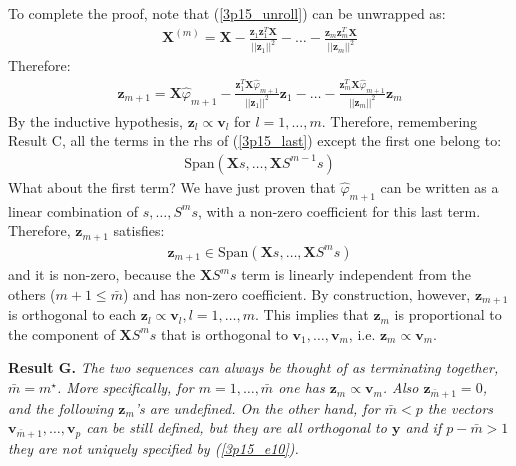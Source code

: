 \begin{itemize}
To complete the proof, note that (\ref{3p15_unroll}) can be unwrapped as:
\begin{eqnarray*}
\mathbf{X}^{(m)} = \mathbf{X} - \frac{ \mathbf{z}_1 \mathbf{z}_1^T \mathbf{X}}{||\mathbf{z}_1||^2} - \ldots  - \frac{ \mathbf{z}_m \mathbf{z}_m^T \mathbf{X}}{||\mathbf{z}_m||^2}
\end{eqnarray*}
Therefore:
\begin{eqnarray} \label{3p15_last}
\mathbf{z}_{m + 1} = \mathbf{X} \hat{\varphi}_{m + 1} - \frac{\mathbf{z}_1^T \mathbf{X} \hat{\varphi}_{m + 1}}{ || \mathbf{z}_1||^2} \mathbf{z}_1 - \ldots - 
\frac{\mathbf{z}_m^T \mathbf{X} \hat{\varphi}_{m + 1}}{ || \mathbf{z}_m||^2} \mathbf{z}_m
\end{eqnarray}
By the inductive hypothesis, $\mathbf{z}_l \propto \mathbf{v}_l$ for $l = 1, \ldots, m$. 
Therefore, remembering Result C, all the terms in the rhs of (\ref{3p15_last}) except the first one belong to:
\begin{eqnarray*}
\textrm{Span} \left( \mathbf{X}s, \ldots, \mathbf{X}S^{m - 1}s \right)
\end{eqnarray*}
What about the first term? We have just proven that $\hat{\varphi}_{m + 1}$ can be written as
a linear combination of $s, \ldots, S^{m}s$, with a non-zero coefficient for this last term.
Therefore, $\mathbf{z}_{m +1}$ satisfies:
\begin{eqnarray*}
\mathbf{z}_{m + 1} \in \textrm{Span} \left( \mathbf{X}s, \ldots, \mathbf{X}S^{m} s \right)
\end{eqnarray*}
and it is non-zero, because the $\mathbf{X}S^{m} s$ term is linearly independent from the 
others ($m + 1 \leq \bar{m}$) and has non-zero coefficient. By construction, however, $\mathbf{z}_{m +1}$ is orthogonal to each $\mathbf{z}_l \propto \mathbf{v}_l, l = 1, \ldots, m$. This implies
that $\mathbf{z}_m$ is proportional to the component of $\mathbf{X} S^{m} s$ that is orthogonal
to $\mathbf{v}_1, \ldots, \mathbf{v}_m$, i.e. $\mathbf{z}_m \propto \mathbf{v}_m$.
\end{itemize}

\vspace{0.5cm}
\noindent \textbf{Result G.} \textit{ The two sequences can always be thought of as terminating together, $\bar{m} = m ^{\star}$. More specifically, for $m = 1, \ldots, \bar{m}$ one has $\mathbf{z}_m \propto \mathbf{v}_m$. Also $\mathbf{z}_{\bar{m} + 1} = 0$, and the following $\mathbf{z}_m$'s are undefined. On the other hand, for $\bar{m} < p$ the vectors $\mathbf{v}_{\bar{m} + 1}, \ldots, \mathbf{v}_{p}$ can be still defined, but they are all orthogonal to $\mathbf{y}$
and if $p - \bar{m} > 1$ they are not uniquely specified by (\ref{3p15_e10}).}

